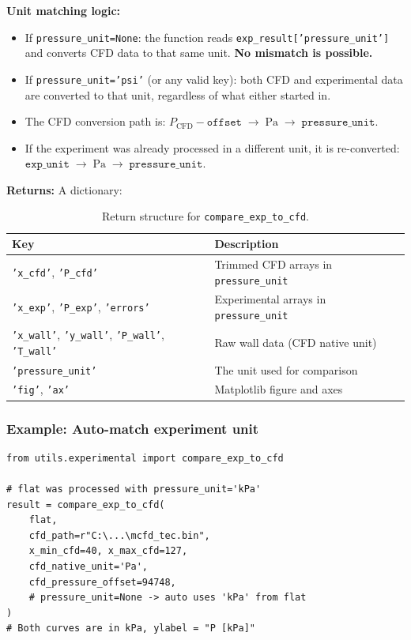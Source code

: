 \documentclass[11pt, letterpaper]{article}
\begin{document}
\textbf{Unit matching logic:}
\begin{itemize}[nosep]
    \item If \texttt{pressure\_unit=None}: the function reads
          \texttt{exp\_result['pressure\_unit']} and converts CFD data to
          that same unit. \textbf{No mismatch is possible.}
    \item If \texttt{pressure\_unit='psi'} (or any valid key): both CFD
          and experimental data are converted to that unit, regardless of
          what either started in.
    \item The CFD conversion path is:
          $P_{\text{CFD}} - \texttt{offset} \;\to\; \text{Pa} \;\to\;
          \texttt{pressure\_unit}$.
    \item If the experiment was already processed in a different unit, it
          is re-converted: $\texttt{exp\_unit} \;\to\; \text{Pa} \;\to\;
          \texttt{pressure\_unit}$.
\end{itemize}

\textbf{Returns:} A dictionary:

\begin{table}[h!]
\centering
\caption{Return structure for \texttt{compare\_exp\_to\_cfd}.}
\begin{tabular}{@{}lp{8.5cm}@{}}
\toprule
\textbf{Key} & \textbf{Description} \\
\midrule
\texttt{'x\_cfd'}, \texttt{'P\_cfd'}         & Trimmed CFD arrays in \texttt{pressure\_unit} \\
\texttt{'x\_exp'}, \texttt{'P\_exp'}, \texttt{'errors'} & Experimental arrays in \texttt{pressure\_unit} \\
\texttt{'x\_wall'}, \texttt{'y\_wall'}, \texttt{'P\_wall'}, \texttt{'T\_wall'} & Raw wall data (CFD native unit) \\
\texttt{'pressure\_unit'}                     & The unit used for comparison \\
\texttt{'fig'}, \texttt{'ax'}                 & Matplotlib figure and axes \\
\bottomrule
\end{tabular}
\end{table}

\subsubsection*{Example: Auto-match experiment unit}

\begin{lstlisting}[caption={CFD vs.\ experiment --- auto unit matching.}]
from utils.experimental import compare_exp_to_cfd

# flat was processed with pressure_unit='kPa'
result = compare_exp_to_cfd(
    flat,
    cfd_path=r"C:\...\mcfd_tec.bin",
    x_min_cfd=40, x_max_cfd=127,
    cfd_native_unit='Pa',
    cfd_pressure_offset=94748,
    # pressure_unit=None -> auto uses 'kPa' from flat
)
# Both curves are in kPa, ylabel = "P [kPa]"
\end{lstlisting}
\end{document}
